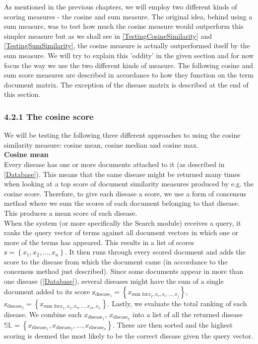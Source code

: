 As mentioned in the previous chapters, we will employ two different kinds of scoring measures - the cosine and sum measure. The original idea, behind using a sum measure, was to test how much the cosine measure would outperform this simpler measure but as we shall see in \ref{TestingCosineSimilarity} and \ref{TestingSumSimilarity}, the cosine measure is actually outperformed itself by the sum measure. We will try to explain this 'oddity' in the given section and for now focus the way we use the two different kinds of measure. The following cosine and sum score measures are described in accordance to how they function on the term document matrix. The exception of the disease matrix is described at the end of this section.\\

\subsubsection{4.2.1 The cosine score\label{CosineScore}}

We will be testing the following three different approaches to using
the cosine similarity measure: cosine mean, cosine median and cosine
max.\\

\textbf{Cosine mean}  \\
Every disease has one or more documents attached to it (as
described in \ref{Database}). This means that the same disease might
be returned many times when looking at a top score of document
similarity measures produced by e.g. the cosine score. Therefore, to
give each disease a score, we use a form of concensus method where we
sum the scores of each document belonging to that disease. This
produces a mean score of each disease. \\

When the system (or more specifically the Search module) receives a
query, it ranks the query vector of terms against all document vectors
in which one or more of the terms has appeared. This results in a list
of scores $\mathbb{x} = \left\{x_1, x_2, \dots, x_n \right\}$. It then
runs through every scored document and adds the score to the disease
from which the document came (in accordance to the concensus method
just described). Since some documents appear in more than one disease
(\ref{Database}), several diseases might have the sum of a single
document added to its score $\mathbb{x}_{\textrm{disease}_{1}} =
\left\{x_{\textrm{sum for} x_2, x_7, x_i, \dots, x_j}\right\}$,
$\mathbb{x}_{\textrm{disease}_{2}} = \left\{x_{\textrm{sum for} x_1,
  x_2, x_9, \dots, x_47, x_n}\right\}$.  Lastly, we evaluate the total
ranking of each disease. We combine each $x_{\textrm{disease}_1}$,
$x_{\textrm{disease}_2}$ into a list of all the returned disease
$\mathbb{SL} = \left\{x_{\textrm{disease}_1},x_{\textrm{disease}_2},
\dots, x_{\textrm{disease}_n}\right\}$. These are then sorted and the
highest scoring is deemed the most likely to be the correct disease
given the query vector. \\

